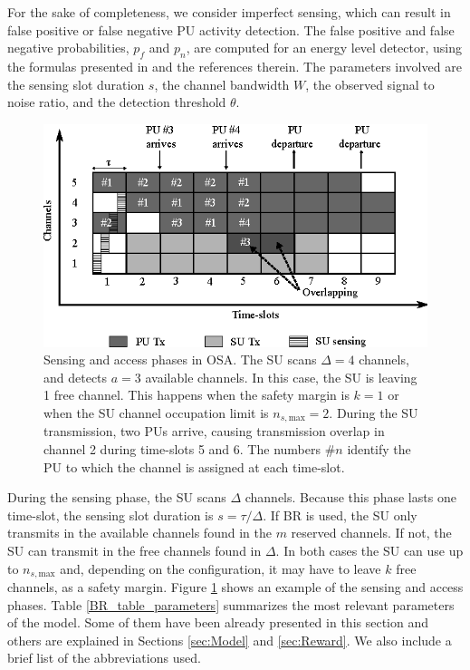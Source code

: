 For the sake of completeness, we consider imperfect sensing, which can result in false positive or false negative PU activity detection. The false positive and false negative probabilities, $p_{f}$ and $p_{n}$, are computed for an energy level detector, using the formulas presented in \cite{ref:comparativaMAC} and the references therein. The parameters involved are the sensing slot duration $s$, the channel bandwidth $W$, the observed signal to noise ratio, and the detection threshold $\theta$.

\begin{figure}[ht]
\centering
\includegraphics[scale=1]{slots.eps}
\caption[]{Sensing and access phases in OSA. The SU scans $\Delta=4$ channels, and detects $a=3$ available channels. In this case, the SU is leaving 1 free channel. This happens when the safety margin is $k=1$ or when the SU channel occupation limit is $n_{s,\text{max}}=2$. During the SU transmission, two PUs arrive, causing transmission overlap in channel 2 during time-slots 5 and 6. The numbers $\#n$ identify the PU to which the channel is assigned at each time-slot.}\label{BR_fig_slots}
\end{figure}

During the sensing phase, the SU scans $\Delta$ channels.
Because this phase lasts one time-slot, the sensing slot duration is $s=\tau/\Delta$.
If BR is used, the SU only transmits in the available channels found in the $m$ reserved channels. If not, the SU can transmit in the free channels found in $\Delta$.  
In both cases the SU can use up to $n_{s,\text{max}}$ and, depending on the configuration, it may have to leave $k$ free channels, as a safety margin.
Figure \ref{BR_fig_slots} shows an example of the sensing and access phases.
Table \ref{BR_table_parameters} summarizes the most relevant parameters of the model. Some of them have been already presented in this section and others are explained in Sections \ref{sec:Model} and \ref{sec:Reward}. We also include a brief list of the abbreviations used.

